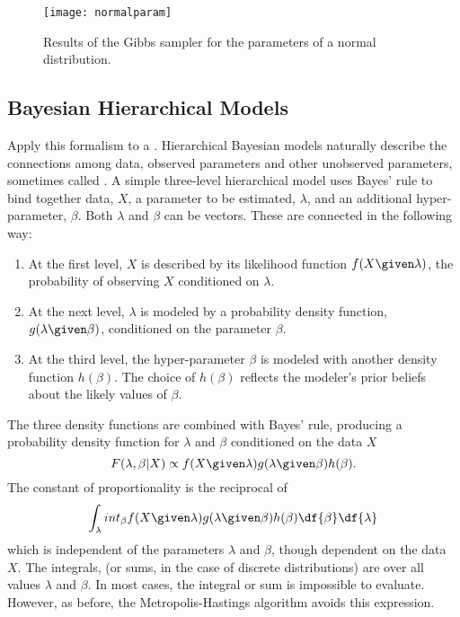 \documentclass[12pt]{article}
\begin{document}
\begin{figure}
    \centering
    \texttt{[image: normalparam]}
    \caption{Results of the Gibbs sampler for the parameters of a normal
    distribution.}%
    \label{fig:gibbsampler:normalparam}
\end{figure}

\subsection*{Bayesian Hierarchical Models}

Apply this formalism to a .%
Hierarchical Bayesian models naturally describe the connections among
data, observed parameters and other unobserved parameters, sometimes
called .%
A simple three-level hierarchical model uses Bayes' rule to bind
together data, \( X \), a parameter to be estimated, \( \lambda \), and
an additional hyper-parameter, \( \beta \).  Both \( \lambda \) and \(
\beta \) can be vectors.  These are connected in the following way:
\begin{enumerate}
    \item
        At the first level, \( X \) is described by its likelihood
        function \( f(X \given \lambda) \), the probability of observing
        \( X \) conditioned on \( \lambda \).
    \item
        At the next level, \( \lambda \) is modeled by a probability
        density function, \( g(\lambda \given \beta) \), conditioned on
        the parameter \( \beta \).
    \item
        At the third level, the hyper-parameter \( \beta \) is modeled
        with another density function \( h(\beta) \).  The choice of \(
        h(\beta) \) reflects the modeler's prior beliefs about the
        likely values of \( \beta \).
\end{enumerate}
The three density functions are combined with Bayes' rule, producing a
probability density function for \( \lambda \) and \( \beta \)
conditioned on the data \( X \)
\[
    F(\lambda, \beta | X) \propto f(X \given \lambda) g(\lambda \given
    \beta) h(\beta).
\] The constant of proportionality is the reciprocal of
\[
    \int_{\lambda} int_{\beta} f(X \given \lambda) g(\lambda \given
    \beta) h(\beta) \df{\beta} \df{\lambda}
\] which is independent of the parameters \( \lambda \) and \( \beta \),
though dependent on the data \( X \).  The integrals, (or sums, in the
case of discrete distributions) are over all values \( \lambda \) and \(
\beta \).  In most cases, the integral or sum is impossible to evaluate.
However, as before, the Metropolis-Hastings algorithm avoids this
expression.
\end{document}
